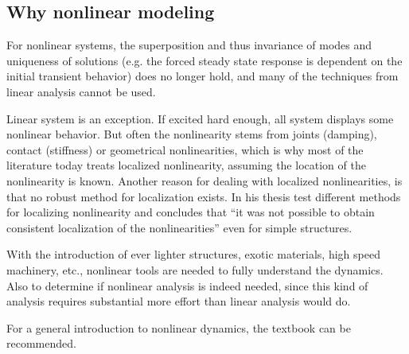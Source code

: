 




\subsection{Why nonlinear modeling}
\label{sec:why-nonl-model}

For nonlinear systems, the superposition and thus invariance of modes and
uniqueness of solutions (e.g. the forced steady state response is dependent on
the initial transient behavior) does no longer hold, and many of the techniques
from linear analysis cannot be used.

Linear system is an exception. If excited hard enough, all system displays some
nonlinear behavior. But often the nonlinearity stems from joints (damping),
contact (stiffness) or geometrical nonlinearities, which is why most of the
literature today treats localized nonlinearity, assuming the location of the
nonlinearity is known.
Another reason for dealing with localized nonlinearities, is that no robust
method for localization exists. In his thesis \textcite{kragh2010a} test different
methods for localizing nonlinearity and concludes that ``it was not possible to
obtain consistent localization of the nonlinearities'' even for simple structures.

With the introduction of ever lighter structures, exotic materials, high speed
machinery, etc., nonlinear tools are needed to fully understand the dynamics.
Also to determine if nonlinear analysis is indeed needed, since this kind of
analysis requires substantial more effort than linear analysis would do.

For a general introduction to nonlinear dynamics, the textbook \textcite{juel2003a}
can be recommended.



